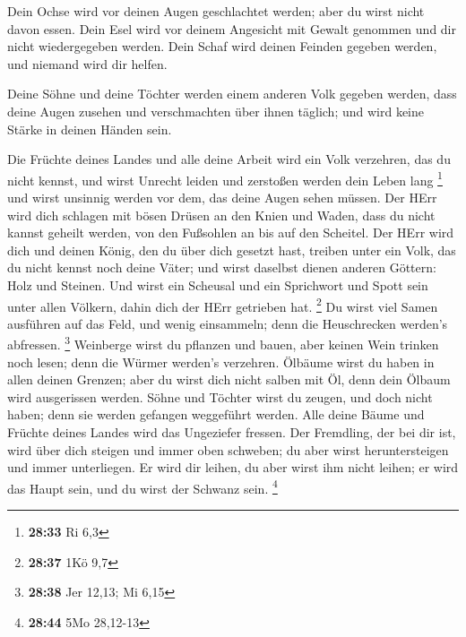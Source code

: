  Dein Ochse wird vor deinen Augen geschlachtet werden; aber
du wirst nicht davon essen. Dein Esel wird vor deinem Angesicht mit
Gewalt genommen und dir nicht wiedergegeben werden. Dein Schaf wird
deinen Feinden gegeben werden, und niemand wird dir helfen.

 Deine Söhne und deine Töchter werden einem anderen Volk
gegeben werden, dass deine Augen zusehen und verschmachten über ihnen
täglich; und wird keine Stärke in deinen Händen sein.

 Die Früchte deines Landes und alle deine Arbeit wird ein
Volk verzehren, das du nicht kennst, und wirst Unrecht leiden und
zerstoßen werden dein Leben lang \footnote{\textbf{28:33} Ri 6,3}
 und wirst unsinnig werden vor dem, das deine Augen sehen
müssen.  Der HErr wird dich schlagen mit bösen Drüsen an
den Knien und Waden, dass du nicht kannst geheilt werden, von den
Fußsohlen an bis auf den Scheitel.  Der HErr wird dich und
deinen König, den du über dich gesetzt hast, treiben unter ein Volk, das
du nicht kennst noch deine Väter; und wirst daselbst dienen anderen
Göttern: Holz und Steinen.  Und wirst ein Scheusal und ein
Sprichwort und Spott sein unter allen Völkern, dahin dich der HErr
getrieben hat. \footnote{\textbf{28:37} 1Kö 9,7}  Du wirst
viel Samen ausführen auf das Feld, und wenig einsammeln; denn die
Heuschrecken werden's abfressen. \footnote{\textbf{28:38} Jer 12,13; Mi
  6,15}  Weinberge wirst du pflanzen und bauen, aber keinen
Wein trinken noch lesen; denn die Würmer werden's verzehren.
 Ölbäume wirst du haben in allen deinen Grenzen; aber du
wirst dich nicht salben mit Öl, denn dein Ölbaum wird ausgerissen
werden.  Söhne und Töchter wirst du zeugen, und doch nicht
haben; denn sie werden gefangen weggeführt werden.  Alle
deine Bäume und Früchte deines Landes wird das Ungeziefer fressen.
 Der Fremdling, der bei dir ist, wird über dich steigen und
immer oben schweben; du aber wirst heruntersteigen und immer
unterliegen.  Er wird dir leihen, du aber wirst ihm nicht
leihen; er wird das Haupt sein, und du wirst der Schwanz sein.
\footnote{\textbf{28:44} 5Mo 28,12-13}

